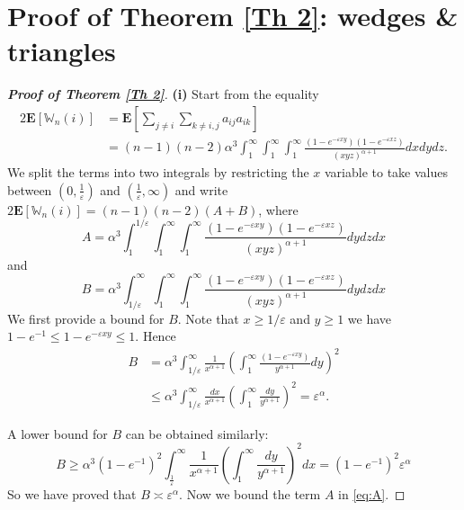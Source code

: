 \documentclass[11pt, reqno]{amsart}
\numberwithin{equation}{section}
\theoremstyle{plain} %
\theoremstyle{definition} %
\newcommand{\eps}{\varepsilon}
\newcommand{\revise}[1]{{\color{black}#1}}
\begin{document}
\section{Proof of Theorem \ref{Th 2}: wedges \& triangles}\label{Proof: Th 2}
\begin{proof}[{\bf Proof of Theorem \ref{Th 2}}]
\revise{
{\bf (i)} Start from the equality
\begin{equation}
\begin{split}
    2 \mathbf{E}\left[\mathbb{W}_n(i)\right] &= \mathbf{E}\left[ \sum_{j \neq i} \sum_{k \neq i,j} a_{ij} a_{ik}  \right] \\
    &=  (n-1) (n-2) \alpha^3 \int_1^{\infty}  \int_1^{\infty}  \int_1^{\infty}  \frac{(1-e^{-\eps x y}) (1-e^{-\eps x z}) }{(xyz)^{\alpha +1}} dx dy dz.
\end{split}
\end{equation}
We split the terms into two integrals by restricting the $x$ variable to take values between $(0,\frac1\eps)$ and $(\frac1\eps,\infty)$ and write $2 \mathbf{E}\left[\mathbb{W}_n(i)\right]=(n-1)(n-2)(A+B)$, where
\begin{equation}\label{eq:A}
A= \alpha^3 \int_1^{1/\eps} \int_1^\infty \int_1^\infty \frac{(1-e^{-\eps x y}) (1-e^{-\eps x z}) }{(xyz)^{\alpha +1}} dydz dx
\end{equation}
and 
\begin{equation}\label{eq:B}
   B= \alpha^3 \int_{1/\eps}^\infty \int_1^\infty \int_1^\infty \frac{(1-e^{-\eps x y}) (1-e^{-\eps x z}) }{(xyz)^{\alpha +1}} dydz dx 
\end{equation}
We first provide a bound for $B$. Note that $x\ge 1/\eps$ and $y\ge 1$ we have $1-e^{-1}\le 1-e^{-\eps xy}\le 1$. 
Hence
\begin{equation}
    \begin{split}
        B&= \alpha^3\int_{1/\eps}^\infty \frac{1}{x^{\alpha+1}}\left( \int_1^\infty \frac{(1-e^{-\eps xy})}{y^{\alpha+1}} dy\right)^2\\
        &\le \alpha^3 \int_{1/\eps}^\infty \frac{dx}{x^{\alpha+1}}\left(\int_1^\infty \frac{dy}{y^{\alpha+1}}\right)^2=\eps^\alpha.
    \end{split}
\end{equation}

A lower bound for $B$ can be obtained similarly: 
\[ 
B \geq \alpha^3\left(1-e^{-1}\right)^2 \int_{\frac{1}{\varepsilon}}^{\infty} \frac{1}{x^{\alpha+1}}\left(\int_1^\infty \frac{dy}{y^{\alpha+1}}\right)^2 d x=\left(1-e^{-1}\right)^2 \varepsilon^\alpha
\]
So we have proved that $B\asymp \eps^\alpha$. Now we bound the term $A$ in \eqref{eq:A}.

}
\end{proof}
\end{document}
